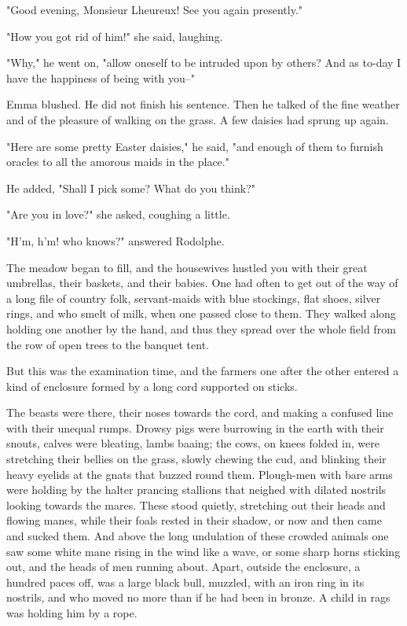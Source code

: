 \documentclass{tufte-book}
\begin{document}
"Good evening, Monsieur Lheureux! See you again presently."

"How you got rid of him!" she said, laughing.

"Why," he went on, "allow oneself to be intruded upon by others? And as
to-day I have the happiness of being with you--"

Emma blushed. He did not finish his sentence. Then he talked of the fine
weather and of the pleasure of walking on the grass. A few daisies had
sprung up again.

"Here are some pretty Easter daisies," he said, "and enough of them to
furnish oracles to all the amorous maids in the place."

He added, "Shall I pick some? What do you think?"

"Are you in love?" she asked, coughing a little.

"H'm, h'm! who knows?" answered Rodolphe.

The meadow began to fill, and the housewives hustled you with their
great umbrellas, their baskets, and their babies. One had often to get
out of the way of a long file of country folk, servant-maids with blue
stockings, flat shoes, silver rings, and who smelt of milk, when one
passed close to them. They walked along holding one another by the hand,
and thus they spread over the whole field from the row of open trees to
the banquet tent.

But this was the examination time, and the farmers one after the other
entered a kind of enclosure formed by a long cord supported on sticks.

The beasts were there, their noses towards the cord, and making a
confused line with their unequal rumps. Drowsy pigs were burrowing in
the earth with their snouts, calves were bleating, lambs baaing; the
cows, on knees folded in, were stretching their bellies on the grass,
slowly chewing the cud, and blinking their heavy eyelids at the gnats
that buzzed round them. Plough-men with bare arms were holding by the
halter prancing stallions that neighed with dilated nostrils looking
towards the mares. These stood quietly, stretching out their heads and
flowing manes, while their foals rested in their shadow, or now and then
came and sucked them. And above the long undulation of these crowded
animals one saw some white mane rising in the wind like a wave, or some
sharp horns sticking out, and the heads of men running about. Apart,
outside the enclosure, a hundred paces off, was a large black bull,
muzzled, with an iron ring in its nostrils, and who moved no more than
if he had been in bronze. A child in rags was holding him by a rope.
\end{document}
